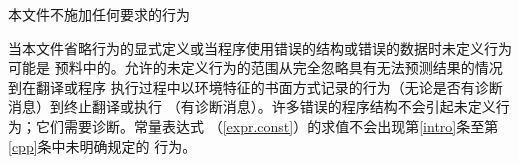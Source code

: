 本文件不施加任何要求的行为

\begin{note}
  当本文件省略行为的显式定义或当程序使用错误的结构或错误的数据时未定义行为可能是
  预料中的。允许的未定义行为的范围从完全忽略具有无法预测结果的情况到在翻译或程序
  执行过程中以环境特征的书面方式记录的行为（无论是否有诊断消息）到终止翻译或执行
  （有诊断消息）。许多错误的程序结构不会引起未定义行为；它们需要诊断。常量表达式
  （\ref{expr.const}）的求值不会出现第\ref{intro}条至第\ref{cpp}条中未明确规定的
  行为。
\end{note}
